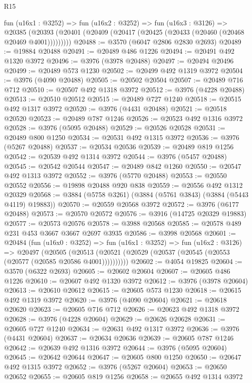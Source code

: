 \begin{lexlean}{R15}
\begin{coremodule}
    fun (u16x1 : @3252) =>
    fun (u16x2 : @3252) =>
    fun (u16x3 : @3126) =>
    @20385 (@20393 (@20401 (@20409 (@20417 (@20425 (@20433 (@20460 (@20468 @20469 @4001)))))))))
@20488 := @3570 (@6047 @2806 @2830 @2693)
@20489 := @19884 @20488
@20491 := @20489 @486 @1226
@20494 := @20491 @492 @1320 @3972
@20496 := @3976 (@3978 @20488)
@20497 := @20494 @20496
@20499 := @20489 @573 @1230
@20502 := @20499 @492 @1319 @3972
@20504 := @3976 (@4090 @20488)
@20505 := @20502 @20504
@20507 := @20489 @716 @712
@20510 := @20507 @492 @1318 @3972
@20512 := @3976 (@4228 @20488)
@20513 := @20510 @20512
@20515 := @20489 @727 @1240
@20518 := @20515 @492 @1317 @3972
@20520 := @3976 (@4431 @20488)
@20521 := @20518 @20520
@20523 := @20489 @787 @1246
@20526 := @20523 @492 @1316 @3972
@20528 := @3976 (@5095 @20488)
@20529 := @20526 @20528
@20531 := @20489 @800 @1250
@20534 := @20531 @492 @1315 @3972
@20536 := @3976 (@5267 @20488)
@20537 := @20534 @20536
@20539 := @20489 @819 @1256
@20542 := @20539 @492 @1314 @3972
@20544 := @3976 (@5457 @20488)
@20545 := @20542 @20544
@20547 := @20489 @842 @1260
@20550 := @20547 @492 @1313 @3972
@20552 := @3976 (@5770 @20488)
@20553 := @20550 @20552
@20556 := @19898 @20488 @920 @838
@20559 := @20556 @492 @1312 @20329
@20568 := @3884 (@5758 @3261) (@3884 (@5761 @3843) (@3884 (@5443 @4119) @19883))
@20570 := @20559 @20568 @3972
@20572 := @3976 (@6177 @20488)
@20573 := @20570 @20572
@20576 := @3916 (@14725 @20329 @19883)
@20577 := @20573 @20576
@20578 := @3988 @20568
@20585 := @20578 @489 @231 @453 @3667 @3667 @2697 @3935
@20586 := @3998 @20568
@20601 := @20484
    (fun (u16x0 : @3252) =>
    fun (u16x1 : @3252) =>
    fun (u16x2 : @3126) =>
    @20497
      (@20505 (@20513 (@20521 (@20529 (@20537 (@20545 (@20553 (@20577 (@20585 @20586 @4001))))))))))
@20602 := @4054 @19825
@20604 := @3570 (@6322 @2693)
@20605 := @20602 @20604
@20607 := @20605 @486 @1226
@20610 := @20607 @492 @1320 @3972
@20612 := @3976 (@3978 @20604)
@20613 := @20610 @20612
@20615 := @20605 @573 @1230
@20618 := @20615 @492 @1319 @3972
@20620 := @3976 (@4090 @20604)
@20621 := @20618 @20620
@20623 := @20605 @716 @712
@20626 := @20623 @492 @1318 @3972
@20628 := @3976 (@4228 @20604)
@20629 := @20626 @20628
@20631 := @20605 @727 @1240
@20634 := @20631 @492 @1317 @3972
@20636 := @3976 (@4431 @20604)
@20637 := @20634 @20636
@20639 := @20605 @787 @1246
@20642 := @20639 @492 @1316 @3972
@20644 := @3976 (@5095 @20604)
@20645 := @20642 @20644
@20647 := @20605 @800 @1250
@20650 := @20647 @492 @1315 @3972
@20652 := @3976 (@5267 @20604)
@20653 := @20650 @20652
@20655 := @20605 @819 @1256
@20658 := @20655 @492 @1314 @3972

\end{coremodule}
\end{lexlean}
